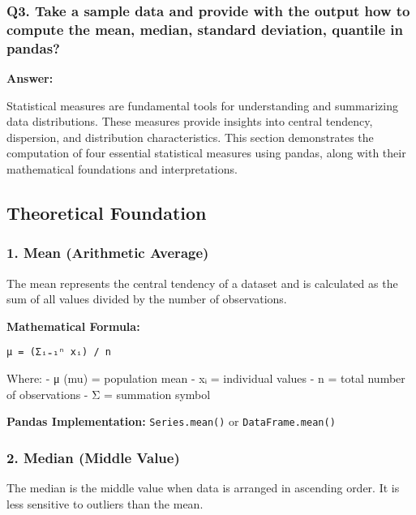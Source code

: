 \documentclass[11pt]{article}
\begin{document}
    \subsubsection{Q3. Take a sample data and provide with the output how to
compute the mean, median, standard deviation, quantile in
pandas?}\label{q3.-take-a-sample-data-and-provide-with-the-output-how-to-compute-the-mean-median-standard-deviation-quantile-in-pandas}

\textbf{Answer:}

Statistical measures are fundamental tools for understanding and
summarizing data distributions. These measures provide insights into
central tendency, dispersion, and distribution characteristics. This
section demonstrates the computation of four essential statistical
measures using pandas, along with their mathematical foundations and
interpretations.

\subsection{Theoretical Foundation}\label{theoretical-foundation}

\subsubsection{\texorpdfstring{1. \textbf{Mean (Arithmetic
Average)}}{1. Mean (Arithmetic Average)}}\label{mean-arithmetic-average}

The mean represents the central tendency of a dataset and is calculated
as the sum of all values divided by the number of observations.

\textbf{Mathematical Formula:}

\begin{verbatim}
μ = (Σᵢ₌₁ⁿ xᵢ) / n
\end{verbatim}

Where: - μ (mu) = population mean - xᵢ = individual values - n = total
number of observations - Σ = summation symbol

\textbf{Pandas Implementation:} \texttt{Series.mean()} or
\texttt{DataFrame.mean()}

\subsubsection{\texorpdfstring{2. \textbf{Median (Middle
Value)}}{2. Median (Middle Value)}}\label{median-middle-value}

The median is the middle value when data is arranged in ascending order.
It is less sensitive to outliers than the mean.
\end{document}
